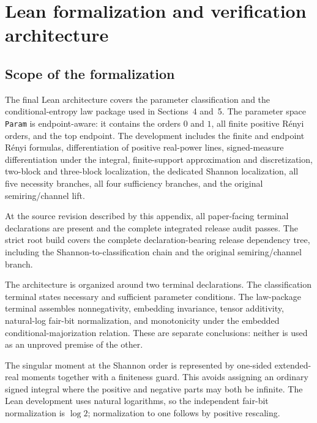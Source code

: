 
\section{Lean formalization and verification architecture}
\label{app:lean-formalization}

\subsection{Scope of the formalization}
\label{app:lean-scope}

The final Lean architecture covers the parameter classification and the
conditional-entropy law package used in Sections~4 and~5.  The parameter space
\texttt{Param} is endpoint-aware: it contains the orders \(0\) and \(1\), all
finite positive R\'enyi orders, and the top endpoint.  The development includes
the finite and endpoint R\'enyi formulas, differentiation of positive
real-power lines, signed-measure differentiation under the integral,
finite-support approximation and discretization, two-block and three-block
localization, the dedicated Shannon localization, all five necessity branches,
all four sufficiency branches, and the original semiring/channel lift.

At the source revision described by this appendix, all paper-facing terminal
declarations are present and the complete integrated release audit passes.  The
strict root build covers the complete declaration-bearing release dependency
tree, including the Shannon-to-classification chain and the original
semiring/channel branch.

The architecture is organized around two terminal declarations.  The classification
terminal  states necessary and sufficient parameter
conditions.  The law-package terminal
 assembles nonnegativity, embedding
invariance, tensor additivity, natural-log fair-bit normalization, and
monotonicity under the embedded conditional-majorization relation.  These are
separate conclusions: neither is used as an unproved premise of the other.

The singular moment at the Shannon order is represented by one-sided
extended-real moments together with a finiteness guard.  This avoids assigning
an ordinary signed integral where the positive and negative parts may both be
infinite.  The Lean development uses natural logarithms, so the independent
fair-bit normalization is \(\log 2\); normalization to one follows by positive
rescaling.


